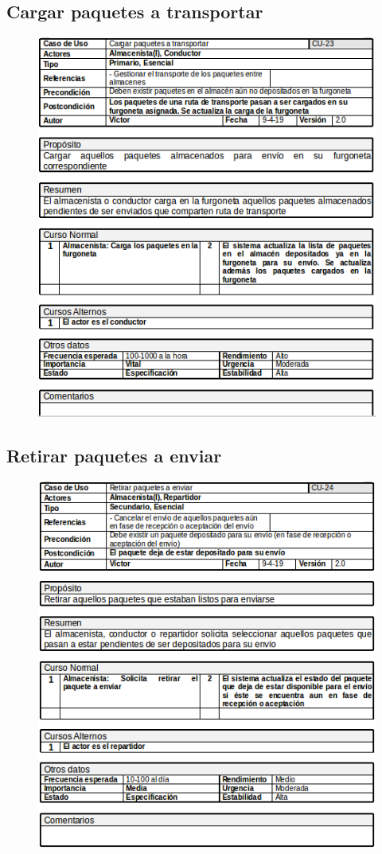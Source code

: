 \subsection{Cargar paquetes a transportar}
\begin{figure}[H]
	\centering
	\includegraphics[width=16cm]{23}
\end{figure}
\subsection{Retirar paquetes a enviar}
\begin{figure}[H]
	\centering
	\includegraphics[width=16cm]{24}
\end{figure}
